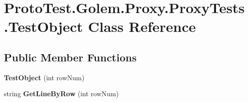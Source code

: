 \hypertarget{class_proto_test_1_1_golem_1_1_proxy_1_1_proxy_tests_1_1_test_object}{\section{Proto\-Test.\-Golem.\-Proxy.\-Proxy\-Tests.\-Test\-Object Class Reference}
\label{class_proto_test_1_1_golem_1_1_proxy_1_1_proxy_tests_1_1_test_object}
}
\subsection*{Public Member Functions}
\begin{DoxyCompactItemize}
\item 
\hypertarget{class_proto_test_1_1_golem_1_1_proxy_1_1_proxy_tests_1_1_test_object_a7f898b0f288965006291639636c25b31}{{\bfseries Test\-Object} (int row\-Num)}\label{class_proto_test_1_1_golem_1_1_proxy_1_1_proxy_tests_1_1_test_object_a7f898b0f288965006291639636c25b31}

\item 
\hypertarget{class_proto_test_1_1_golem_1_1_proxy_1_1_proxy_tests_1_1_test_object_abbbfdd8fb2147ddf5592c2cb50e2ce51}{string {\bfseries Get\-Line\-By\-Row} (int row\-Num)}\label{class_proto_test_1_1_golem_1_1_proxy_1_1_proxy_tests_1_1_test_object_abbbfdd8fb2147ddf5592c2cb50e2ce51}

\end{DoxyCompactItemize}
